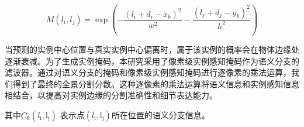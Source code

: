\begin{equation}
    M\left(l_i, l_j\right)=\exp \left(-\frac{\left(l_i+d_i-x_k\right)^2}{w^2}-\frac{\left(l_j+d_j-y_k\right)^2}{h^2}\right)
    \end{equation}

当预测的实例中心位置与真实实例中心偏离时，属于该实例的概率会在物体边缘处逐渐衰减。为了生成实例掩码，本研究采用了像素级实例感知掩码作为语义分支的滤波器。通过对语义分支的掩码和像素级实例感知掩码进行逐像素的乘法运算，我们得到了最终的全景分割分数。这种逐像素的乘法运算将语义信息和实例感知信息相结合，以提高对实例边缘的分割准确性和细节表达能力。



其中$ C_k\left(l_{\mathrm{i}}, \mathrm{l}_{\mathrm{j}}\right) $
表示点$ \left(l_{\mathrm{i}}, \mathrm{l}_{\mathrm{j}}\right) $所在位置的语义分支信息。

